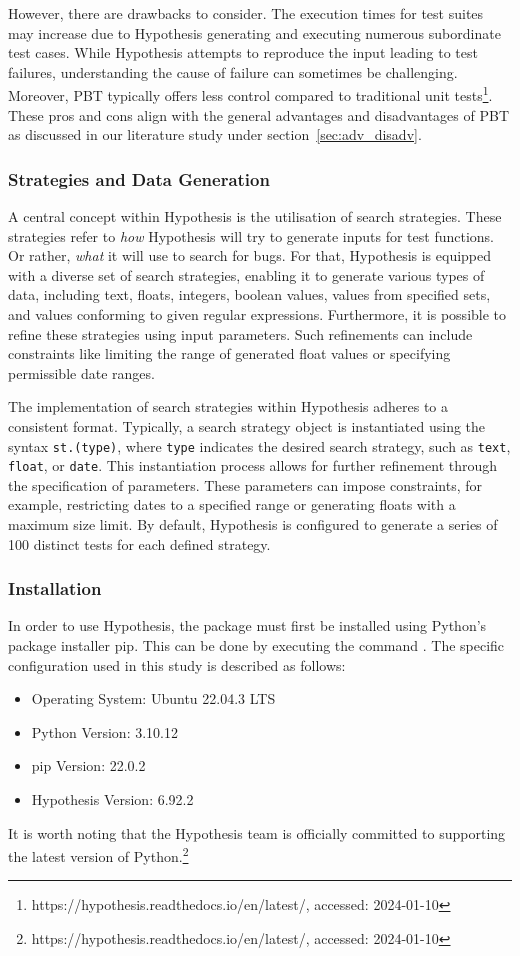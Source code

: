 \documentclass[runningheads]{llncs}
\begin{document}
However, there are drawbacks to consider. The execution times for test suites may increase due to Hypothesis generating and executing numerous subordinate test cases. While Hypothesis attempts to reproduce the input leading to test failures, understanding the cause of failure can sometimes be challenging. Moreover, PBT typically offers less control compared to traditional unit tests\footnote{https://hypothesis.readthedocs.io/en/latest/, accessed: 2024-01-10}. These pros and cons align with the general advantages and disadvantages of PBT as discussed in our literature study under section~\ref{sec:adv_disadv}.

\subsubsection{Strategies and Data Generation}
A central concept within Hypothesis is the utilisation of search strategies. These strategies refer to \textit{how} Hypothesis will try to generate inputs for test functions. Or rather, \textit{what} it will use to search for bugs. For that, Hypothesis is equipped with a diverse set of search strategies, enabling it to generate various types of data, including text, floats, integers, boolean values, values from specified sets, and values conforming to given regular expressions. Furthermore, it is possible to refine these strategies using input parameters. Such refinements can include constraints like limiting the range of generated float values or specifying permissible date ranges.

The implementation of search strategies within Hypothesis adheres to a consistent format. Typically, a search strategy object is instantiated using the syntax \texttt{st.(type)}, where \texttt{type} indicates the desired search strategy, such as \texttt{text}, \texttt{float}, or \texttt{date}. This instantiation process allows for further refinement through the specification of parameters. These parameters can impose constraints, for example, restricting dates to a specified range or generating floats with a maximum size limit. By default, Hypothesis is configured to generate a series of 100 distinct tests for each defined strategy.

\subsubsection{Installation}
In order to use Hypothesis, the package must first be installed using Python's package installer pip. This can be done by executing the command . The specific configuration used in this study is described as follows:
\begin{itemize}
  \item Operating System: Ubuntu 22.04.3 LTS
  \item Python Version: 3.10.12
  \item pip Version: 22.0.2
  \item Hypothesis Version: 6.92.2
\end{itemize}
It is worth noting that the Hypothesis team is officially committed to supporting the latest version of Python.\footnote{https://hypothesis.readthedocs.io/en/latest/, accessed: 2024-01-10}
\end{document}
